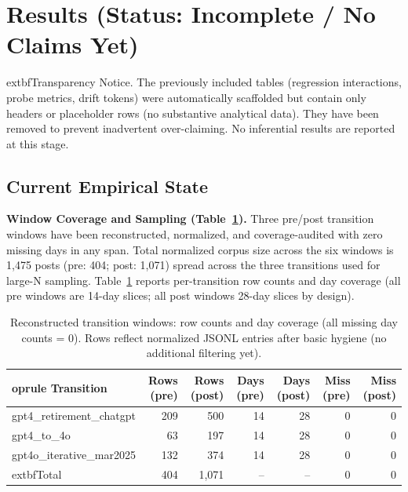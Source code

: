 \documentclass{article}
\begin{document}
\section{Results (Status: Incomplete / No Claims Yet)}
	extbf{Transparency Notice.} The previously included tables (regression interactions, probe metrics, drift tokens) were automatically scaffolded but contain only headers or placeholder rows (no substantive analytical data). They have been removed to prevent inadvertent over-claiming. No inferential results are reported at this stage.

\subsection*{Current Empirical State}
\noindent\textbf{Window Coverage and Sampling (Table~\ref{tab:coverage}).} Three pre/post transition windows have been reconstructed, normalized, and coverage-audited with zero missing days in any span. Total normalized corpus size across the six windows is 1,475 posts (pre: 404; post: 1,071) spread across the three transitions used for large-N sampling. Table~\ref{tab:coverage} reports per-transition row counts and day coverage (all pre windows are 14-day slices; all post windows 28-day slices by design).

\begin{table}[htbp]
  \centering
  \caption{Reconstructed transition windows: row counts and day coverage (all missing day counts = 0). Rows reflect normalized JSONL entries after basic hygiene (no additional filtering yet).}
  \label{tab:coverage}
  \begin{tabular}{lrrrrrr}
  	oprule
    Transition & Rows (pre) & Rows (post) & Days (pre) & Days (post) & Miss (pre) & Miss (post) \\
    \midrule
    gpt4\_retirement\_chatgpt & 209 & 500 & 14 & 28 & 0 & 0 \\
    gpt4\_to\_4o & 63 & 197 & 14 & 28 & 0 & 0 \\
    gpt4o\_iterative\_mar2025 & 132 & 374 & 14 & 28 & 0 & 0 \\
  \midrule
  	extbf{Total} & 404 & 1,071 & -- & -- & 0 & 0 \\
    \bottomrule
  \end{tabular}
\end{table}
\end{document}
